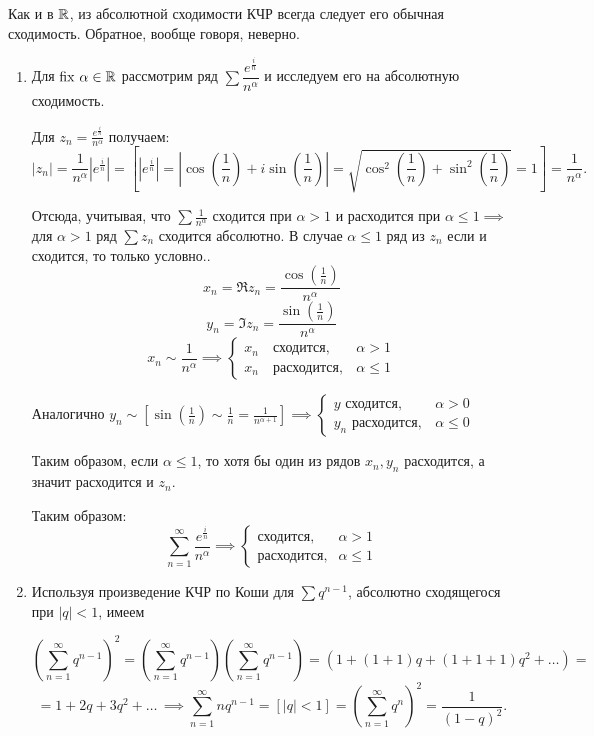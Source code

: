 \documentclass[../../main.tex]{subfiles}
\begin{document}
\begin{rem}
	Как и в $ \mathbb{R} $, из абсолютной сходимости КЧР всегда следует его обычная 
	сходимость. Обратное, вообще говоря, неверно.
\end{rem}

\begin{exmp}
	\;
	\begin{enumerate}
		\item Для $ \operatorname{fix}\, \alpha \in \mathbb{R} $ рассмотрим ряд $ \sum 
		\dfrac{e^{\frac{i}{n}}}{n^\alpha} $ и исследуем его на абсолютную сходимость.
		
		Для $ z_n = \frac{e^{\frac{i}{n}}}{n^\alpha}$ получаем: \[|z_n| = 
		\frac{1}{n^\alpha} |e^{\frac{i}{n}}| = \left[|e^{\frac{i}{n}}| = 
		\left|\cos\left(\frac{1}{n}\right) + i\sin\left(\frac{1}{n}\right)\right| = 
		\sqrt{\cos^2\left(\frac{1}{n}\right) + 
		\sin^2\left(\frac{1}{n}\right)} = 1\right] = \frac{1}{n^\alpha}.\]
		
		Отсюда, учитывая, что $ \sum \frac{1}{n^\alpha} $ сходится при $ \alpha > 1 
		$ и расходится при $ \alpha \leq 1 \implies $ для $ \alpha > 1 $ ряд $
		\sum z_n $ сходится абсолютно. В случае $ \alpha \leq 1 $ ряд из $ z_n $ 
		если и сходится, то только условно..
		\[x_n = \Re z_n = \frac{\cos(\frac{1}{n})}{n^\alpha}\]
		\[y_n = \Im z_n = \frac{\sin(\frac{1}{n})}{n^\alpha}\]
		\[x_n \sim \frac{1}{n^\alpha} \implies 
		\begin{cases}
			x_n \quad \text{сходится}, &\alpha > 1 \\
			x_n \quad \text{расходится}, &\alpha \leq 1
		\end{cases}\]
		
		Аналогично $\displaystyle y_n \sim \left[\sin\left(\frac{1}{n}\right) \sim 
		\frac{1}{n} = 
		\frac{1}{n^{\alpha + 1}}\right] \implies
		\begin{cases}
		y  \text{ сходится},& \alpha > 0 \\
		y_n  \text{ расходится},& \alpha \leq 0
		\end{cases} $
		
		Таким образом, если $ \alpha \leq 1 $, то хотя бы один из рядов $ x_n, y_n $ 
		расходится, а значит расходится и $ z_n $.
		
		Таким образом:
		\[ \sum_{n=1}^{\infty}\frac{e^{\frac{i}{n}}}{n^\alpha}\implies
		\begin{cases}
		\text{сходится},& \alpha > 1 \\
		\text{расходится},& \alpha \leq 1
		\end{cases}\]
		
	\item Используя произведение КЧР по Коши для $ \sum q^{n - 1} $, абсолютно 
	сходящегося при ${|q| < 1}$, имеем
	
	\[\left(\sum_{n=1}^{\infty}q^{n - 1}\right)^2 = \left(\sum_{n=1}^{\infty}q^{n 
	- 
	1}\right)\left(\sum_{n=1}^{\infty}q^{n - 1}\right) = (1 + (1 + 1)q + (1 + 1 + 
	1)q^2 + \ldots ) = \]
	\[= 1 + 2q + 3q^2 + \ldots\, \implies
	\sum_{n=1}^{\infty}nq^{n - 1} = [|q| < 1] = 
	\left(\sum_{n=1}^{\infty}q^{n}\right)^2 = 
	\frac{1}{(1 - q)^2}.\]
	\end{enumerate}
\end{exmp}
\end{document}
